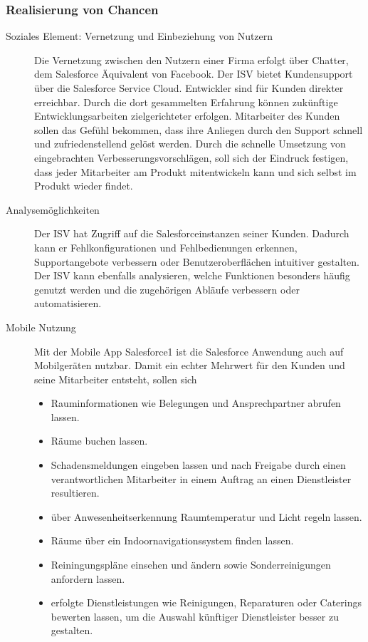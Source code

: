 \subsubsection{Realisierung von Chancen}
\begin{description}
	\item[Soziales Element: Vernetzung und Einbeziehung von Nutzern] Die 
Vernetzung zwischen den Nutzern einer Firma erfolgt über Chatter, dem 
Salesforce Äquivalent von Facebook. Der ISV bietet Kundensupport über die 
Salesforce Service Cloud. Entwickler sind für Kunden direkter erreichbar. Durch 
die dort gesammelten Erfahrung können zukünftige Entwicklungsarbeiten 
zielgerichteter erfolgen. Mitarbeiter des Kunden sollen das Gefühl bekommen, 
dass ihre Anliegen durch den Support schnell und zufriedenstellend gelöst 
werden. Durch die schnelle Umsetzung von eingebrachten 
Verbesserungsvorschlägen, soll sich der Eindruck festigen, dass jeder 
Mitarbeiter am Produkt mitentwickeln kann und sich selbst im Produkt wieder 
findet.
	\item[Analysemöglichkeiten] Der ISV hat Zugriff auf die 
Salesforceinstanzen seiner Kunden. Dadurch kann er Fehlkonfigurationen 
und Fehlbedienungen erkennen, Supportangebote verbessern oder 
Benutzeroberflächen intuitiver gestalten. Der ISV kann ebenfalls analysieren, 
welche Funktionen besonders häufig genutzt werden und die zugehörigen Abläufe 
verbessern oder automatisieren.
	\item[Mobile Nutzung] Mit der Mobile App Salesforce1 ist die Salesforce 
Anwendung auch auf Mobilgeräten nutzbar. Damit ein echter Mehrwert für 
den Kunden und seine Mitarbeiter entsteht, sollen sich
\begin{itemize}
	\item Rauminformationen wie Belegungen und Ansprechpartner abrufen 
lassen.
	\item Räume buchen lassen.
	\item Schadensmeldungen eingeben lassen und nach Freigabe durch einen 
verantwortlichen Mitarbeiter in einem Auftrag an einen Dienstleister 
resultieren.
	\item über Anwesenheitserkennung Raumtemperatur und Licht regeln lassen.
	\item Räume über ein Indoornavigationssystem finden lassen.
	\item Reiningungspläne einsehen und ändern sowie Sonderreinigungen 
anfordern lassen.
	\item erfolgte Dienstleistungen wie Reinigungen, Reparaturen oder 
Caterings bewerten lassen, um die Auswahl künftiger Dienstleister besser zu 
gestalten.
\end{itemize}


\end{description}
